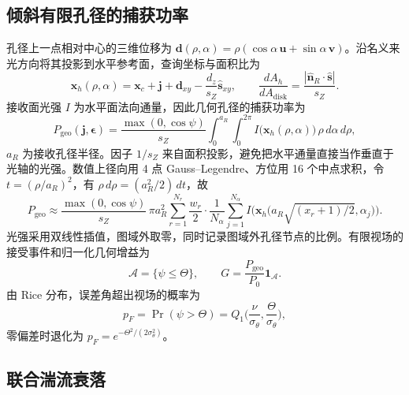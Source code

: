 \subsection{倾斜有限孔径的捕获功率}

孔径上一点相对中心的三维位移为 $\mathbf d(\rho,\alpha)=\rho(\cos\alpha\,\mathbf u+\sin\alpha\,\mathbf v)$。沿名义来光方向将其投影到水平参考面，查询坐标与面积比为
\begin{equation}
\mathbf x_h(\rho,\alpha)=\mathbf x_c+\mathbf j+\mathbf d_{xy}-\frac{d_z}{s_Z}\hat{\mathbf s}_{xy},\qquad
\frac{dA_h}{dA_{\mathrm{disk}}}=\frac{|\hat{\mathbf n}_R\cdot\hat{\mathbf s}|}{s_Z}.
\label{eq:c5_projection}
\end{equation}
接收面光强 $I$ 为水平面法向通量，因此几何孔径的捕获功率为
\begin{equation}
P_{\mathrm{geo}}(\mathbf j,\boldsymbol\epsilon)=\frac{\max(0,\cos\psi)}{s_Z}\int_0^{a_R}\!\!\int_0^{2\pi}I\big(\mathbf x_h(\rho,\alpha)\big)\,\rho\,d\alpha\,d\rho,
\label{eq:c5_pgeo}
\end{equation}
$a_R$ 为接收孔径半径。因子 $1/s_Z$ 来自面积投影，避免把水平通量直接当作垂直于光轴的光强。数值上径向用 4 点 Gauss--Legendre、方位用 16 个中点求积，令 $t=(\rho/a_R)^2$，有 $\rho\,d\rho=(a_R^2/2)\,dt$，故
\begin{equation}
P_{\mathrm{geo}}\approx\frac{\max(0,\cos\psi)}{s_Z}\,\pi a_R^2\sum_{r=1}^{N_r}\frac{w_r}{2}\cdot\frac{1}{N_\alpha}\sum_{j=1}^{N_\alpha}I\Big(\mathbf x_h\big(a_R\sqrt{(x_r+1)/2},\alpha_j\big)\Big).
\label{eq:c5_pgeo_num}
\end{equation}
光强采用双线性插值，图域外取零，同时记录图域外孔径节点的比例。有限视场的接受事件和归一化几何增益为
\begin{equation}
\mathcal A=\{\psi\le\Theta\},\qquad G=\frac{P_{\mathrm{geo}}}{P_0}\mathbf 1_{\mathcal A}.
\label{eq:c5_gain}
\end{equation}
由 Rice 分布，误差角超出视场的概率为
\begin{equation}
p_F=\Pr(\psi>\Theta)=Q_1\Big(\frac{\nu}{\sigma_\theta},\frac{\Theta}{\sigma_\theta}\Big),
\label{eq:c5_pf}
\end{equation}
零偏差时退化为 $p_F=e^{-\Theta^2/(2\sigma_\theta^2)}$。

\subsection{联合湍流衰落}

